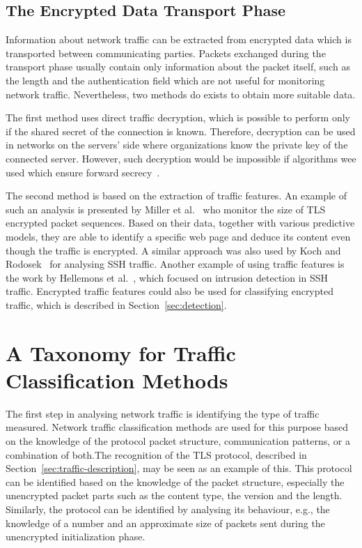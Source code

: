 \subsection{The Encrypted Data Transport Phase}

Information about network traffic can be extracted from encrypted data which is transported between communicating parties. Packets exchanged during the transport phase usually contain only information about the packet itself, such as the length and the authentication field which are not useful for monitoring network traffic. Nevertheless, two methods do exists to obtain more suitable data. 

The first method uses direct traffic decryption, which is possible to perform only if the shared secret of the connection is known. Therefore, decryption can be used in networks on the servers' side where organizations know the private key of the connected server. However, such decryption would be impossible if algorithms wee used which ensure forward secrecy~\cite{Huang-2014-tls-forward-secrecy}. 

The second method is based on the extraction of traffic features. An example of such an analysis is presented by Miller et al.~\cite{Miller-2014-https-decrypt} who monitor the size of TLS encrypted packet sequences. Based on their data, together with various predictive models, they are able to identify a specific web page and deduce its content even though the traffic is encrypted. A similar approach was also used by Koch and Rodosek~\cite{Koch-2010-Command} for analysing SSH traffic. Another example of using traffic features is the work by Hellemons et al.~\cite{hellmons-2012-sshcure}, which focused on intrusion detection in SSH traffic. Encrypted traffic features could also be used for classifying encrypted traffic, which is described in Section~\ref{sec:detection}.




\section{A Taxonomy for Traffic Classification Methods} \label{sec:taxonomy}

The first step in analysing network traffic is identifying the type of traffic measured. Network traffic classification methods are used for this purpose based on the knowledge of the protocol packet structure, communication patterns, or a combination of both.The recognition of the TLS protocol, described in Section~\ref{sec:traffic-description}, may be seen as an example of this. This protocol can be identified based on the knowledge of the packet structure, especially the unencrypted packet parts such as the content type, the version and the length. Similarly, the protocol can be identified by analysing its behaviour, e.g., the knowledge of a number and an approximate size of packets sent during the unencrypted initialization phase.

